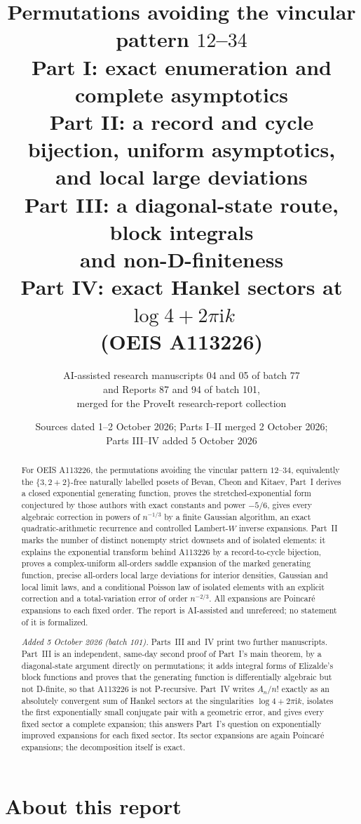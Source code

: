 \documentclass[11pt]{article}
\title{Permutations avoiding the vincular pattern $12$--$34$\\[4pt]
\large Part I: exact enumeration and complete asymptotics\\
Part II: a record and cycle bijection, uniform asymptotics,\\ and local large deviations\\
Part III: a diagonal-state route, block integrals\\ and non-D-finiteness\\
Part IV: exact Hankel sectors at $\log4+2\pi\mathrm i k$\\[4pt]
\normalsize (OEIS A113226)}
\author{AI-assisted research manuscripts 04 and 05 of batch 77\\
and Reports 87 and 94 of batch 101,\\
merged for the ProveIt research-report collection}
\date{Sources dated 1--2 October 2026; Parts I--II merged 2 October 2026;\\
Parts III--IV added 5 October 2026}
\theoremstyle{remark}\newtheorem{remark}[theorem]{Remark}
\begin{document}
\maketitle
\begin{abstract}
For OEIS A113226, the permutations avoiding the vincular pattern
$12$--$34$, equivalently the $\{3,2+2\}$-free naturally labelled posets of
Bevan, Cheon and Kitaev, Part~I derives a closed exponential generating
function, proves the stretched-exponential form conjectured by those
authors with exact constants and power $-5/6$, gives every algebraic
correction in powers of $n^{-1/3}$ by a finite Gaussian algorithm, an
exact quadratic-arithmetic recurrence and controlled Lambert-$W$ inverse
expansions. Part~II marks the number of distinct nonempty strict downsets
and of isolated elements: it explains the exponential transform behind
A113226 by a record-to-cycle bijection, proves a complex-uniform
all-orders saddle expansion of the marked generating function, precise
all-orders local large deviations for interior densities, Gaussian and
local limit laws, and a conditional Poisson law of isolated elements with
an explicit correction and a total-variation error of order $n^{-2/3}$.
All expansions are Poincar\'e expansions to each fixed order.
The report is AI-assisted and unrefereed; no statement of it is
formalized.

\emph{Added 5 October 2026 (batch 101).} Parts~III and~IV print two
further manuscripts. Part~III is an independent, same-day second proof of
Part~I's main theorem, by a diagonal-state argument directly on
permutations; it adds integral forms of Elizalde's block functions and
proves that the generating function is differentially algebraic but not
D-finite, so that A113226 is not P-recursive. Part~IV writes $A_n/n!$
exactly as an absolutely convergent sum of Hankel sectors at the
singularities $\log4+2\pi\mathrm ik$, isolates the first exponentially
small conjugate pair with a geometric error, and gives every fixed sector a
complete expansion; this answers Part~I's question on exponentially
improved expansions for each fixed sector. Its sector expansions are again
Poincar\'e expansions; the decomposition itself is exact.
\end{abstract}

\tableofcontents

\section*{About this report}
\end{document}
